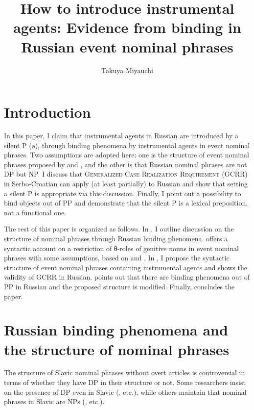 \documentclass[output=paper,
]{langscibook}
\title{How to introduce instrumental agents: Evidence from binding in Russian event nominal phrases}
\author{%
 Takuya Miyauchi\affiliation{Tokyo University of Foreign Studies and\\Japan Society for the Promotion of Science}
}
\begin{document}
%
\maketitle
{}

\section{Introduction}
In this paper, I claim that instrumental agents in Russian are introduced by a silent P (ø), through binding phenomena by instrumental agents in event nominal phrases. Two assumptions are adopted here: one is the structure of event nominal phrases proposed by \cite{MiyauchiIto2016} and \cite{Miyauchi2017b}, and the other is that Russian nominal phrases are not DP but NP. I discuss that \textsc{Generalized Case Realization Requirement} (GCRR) in Serbo-Croatian \citep{Horvath2014} can apply (at least partially) to Russian and show that setting a silent P is appropriate via this discussion. Finally, I point out a possibility to bind objects out of PP and demonstrate that the silent P is a lexical preposition, not a functional one. 


The rest of this paper is organized as follows. In , I outline discussion on the structure of nominal phrases through  Russian binding phenomena.  offers a syntactic account on a restriction of θ-roles of genitive nouns in event nominal phrases with some assumptions, based on \cite{MiyauchiIto2016} and \cite{Miyauchi2017b}. In , I propose the syntactic structure of event nominal phrases containing instrumental agents and  shows the validity of GCRR in Russian.  points out that there are binding phenomena out of PP in Russian and the proposed structure is modified. Finally,  concludes the paper. 

\section{Russian binding phenomena and the structure of nominal phrases}\label{sec:BIND}

The structure of Slavic nominal phrases without overt articles is controversial in terms of whether they have DP in their structure or not. Some researchers insist on the presence of DP even in Slavic (\citealt{Progovac1998,Rappaport2002,Rutkowski2002,Basic2004,FranksPereltsvaig2004,Pereltsvaig2007a,RutokowskiMaliszewska2007,Laterza2016}, etc.), while others maintain that nominal phrases in Slavic are NPs (\citealt{Zlatic1998,Trenkic2004,Boskovic2005, Boskovic2007, Boskovic2009,Petrovic2011,Despic2013}, etc.).
\end{document}
